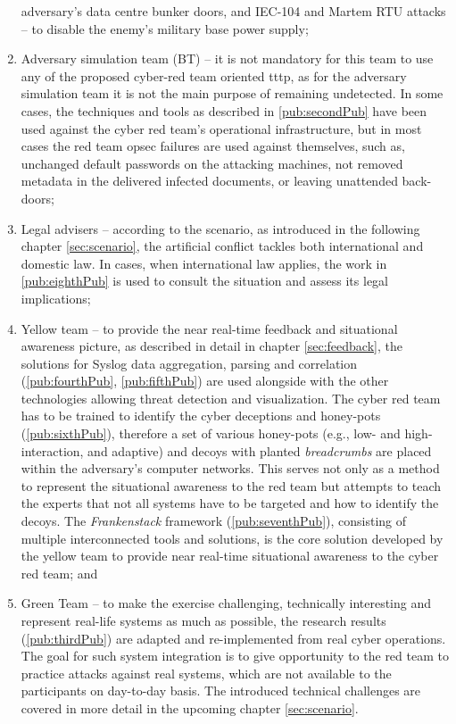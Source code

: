 \begin{enumerate}
adversary's data centre bunker doors, and IEC-104 and Martem RTU attacks -- to disable the enemy's military base power supply;
    \item Adversary simulation team (BT) -- it is not mandatory for this team to use any of the proposed cyber-red team oriented \gls{tttp}, as for the adversary simulation team it is not the main purpose of remaining undetected. In some cases, the techniques and tools as described in \ref{pub:secondPub} have been used against the cyber red team's operational infrastructure, but in most cases the red team \gls{opsec} failures are used against themselves, such as, unchanged default passwords on the attacking machines, not removed metadata in the delivered infected documents, or leaving unattended back-doors;
    \item Legal advisers -- according to the scenario, as introduced in the following chapter \ref{sec:scenario}, the artificial conflict tackles both international and domestic law. In cases, when international law applies, the work in \ref{pub:eighthPub} is used to consult the situation and assess its legal implications;
    \item Yellow team -- to provide the near real-time feedback and situational awareness picture, as described in detail in chapter \ref{sec:feedback}, the solutions for Syslog data aggregation, parsing and correlation (\ref{pub:fourthPub}, \ref{pub:fifthPub}) are used alongside with the other technologies allowing threat detection and visualization. The cyber red team has to be trained to identify the cyber deceptions and honey-pots (\ref{pub:sixthPub}), therefore a set of various honey-pots (e.g., low- and high-interaction, and adaptive) and decoys with planted \textit{breadcrumbs} are placed within the adversary's computer networks. This serves not only as a method to represent the situational awareness to the red team but attempts to teach the experts that not all systems have to be targeted and how to identify the decoys. The \textit{Frankenstack} framework (\ref{pub:seventhPub}), consisting of multiple interconnected tools and solutions, is the core solution developed by the yellow team to provide near real-time situational awareness to the cyber red team; and
    \item Green Team -- to make the exercise challenging, technically interesting and represent real-life systems as much as possible, the research results (\ref{pub:thirdPub}) are adapted and re-implemented from real cyber operations. The goal for such system integration is to give opportunity to the red team to practice attacks against real systems, which are not available to the participants on day-to-day basis. The introduced technical challenges are covered in more detail in the upcoming chapter \ref{sec:scenario}.
\end{enumerate}

